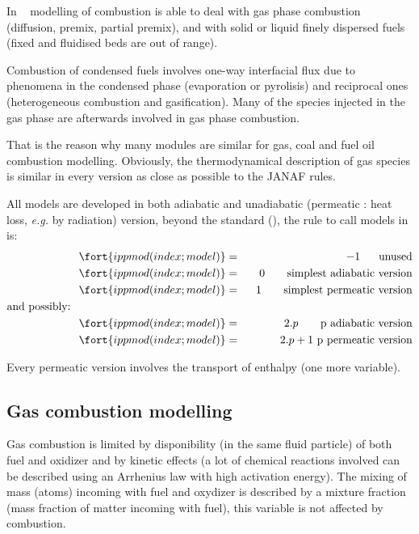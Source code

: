 In \CS~ modelling of combustion is able to deal with gas phase combustion
(diffusion, premix, partial premix), and with solid or liquid finely dispersed
fuels (fixed and fluidised beds are out of range).

Combustion of condensed fuels involves one-way interfacial flux due to phenomena in the condensed phase (evaporation or pyrolisis) and reciprocal ones
(heterogeneous combustion and gasification). Many of the species injected in the gas phase are afterwards involved in
gas phase combustion.

That is the reason why many modules are similar for gas, coal and fuel oil
combustion modelling. Obviously, the thermodynamical description of gas
species is similar in every version as close as possible to the JANAF rules.

All models are developed in both adiabatic and unadiabatic (permeatic : heat
loss, \emph{e.g.} by radiation) version, beyond the standard (), the rule to call models in  is:
\begin{eqnarray}
\fort{ippmod(index ; model)}  &=&     -1   ~~\quad \text{unused}                     \nonumber \\
\fort{ippmod(index ; model)}  &=& ~~   0  ~~~\quad \text{simplest adiabatic version} \nonumber \\
\fort{ippmod(index ; model)}  &=& ~~  1  ~~~\quad \text{simplest permeatic version}  \label{Eqs_00A}\\
\text{and possibly:}\qquad\qquad\qquad\qquad\qquad\qquad\qquad \nonumber & &\\
\fort{ippmod(index ; model)}  &=&  2.p    \qquad \text{p} ~\text{adiabatic version}  \nonumber \\
\fort{ippmod(index ; model)}  &=&  2.p+1 ~       \text{p} ~\text{permeatic version}  \nonumber
\end{eqnarray}


Every permeatic version involves the transport of enthalpy (one more variable).

\subsection{Gas combustion modelling}

Gas combustion is limited by disponibility (in the same fluid particle) of both
fuel and oxidizer and by kinetic effects (a lot of chemical reactions involved
can be described using an Arrhenius law with high activation energy). The mixing of mass (atoms) incoming with fuel and oxydizer is described by a mixture
fraction (mass fraction of matter incoming with fuel), this
variable is not affected by combustion.

